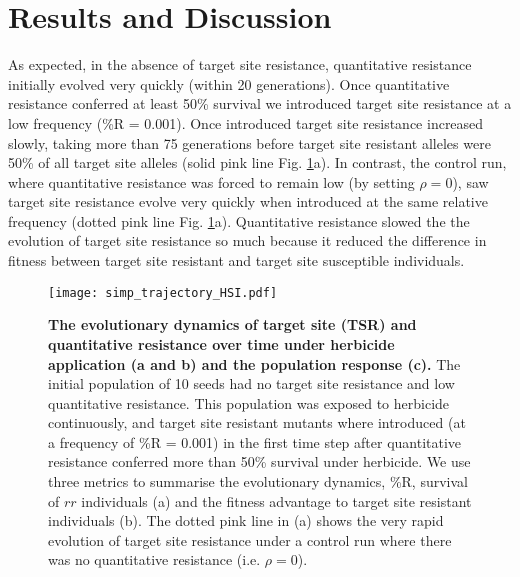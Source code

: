 \documentclass[10pt,letterpaper]{article}
\begin{document}
\section*{Results and Discussion}
As expected, in the absence of target site resistance, quantitative resistance initially evolved very quickly (within 20 generations). Once quantitative resistance conferred at least 50\% survival we introduced target site resistance at a low frequency (\%R = 0.001). Once introduced target site resistance increased slowly, taking more than 75 generations before target site resistant alleles were 50\% of all target site alleles (solid pink line Fig. \ref{fig:simp_traj}a). In contrast, the control run, where quantitative resistance was forced to remain low (by setting $\rho = 0$), saw target site resistance evolve very quickly when introduced at the same relative frequency (dotted pink line Fig. \ref{fig:simp_traj}a). Quantitative resistance slowed the the evolution of target site resistance so much because it reduced the difference in fitness between target site resistant and target site susceptible individuals.      

\begin{figure}[!h] 
	\texttt{[image: simp\_trajectory\_HSI.pdf]}
\caption{{\bf The evolutionary dynamics of target site (TSR) and quantitative resistance over time under herbicide application (a and b) and the population response (c).} The initial population of 10 seeds had no target site resistance and low quantitative resistance. This population was exposed to herbicide continuously, and target site resistant mutants where introduced (at a frequency of \%R = 0.001) in the first time step after quantitative resistance conferred more than 50\% survival under herbicide. We use three metrics to summarise the evolutionary dynamics, \%R, survival of $rr$ individuals (a) and the fitness advantage to target site resistant individuals (b). The dotted pink line in (a) shows the very rapid evolution of target site resistance under a control run where there was no quantitative resistance (i.e. $\rho = 0$).} 
\label{fig:simp_traj}
\end{figure}
\end{document}
